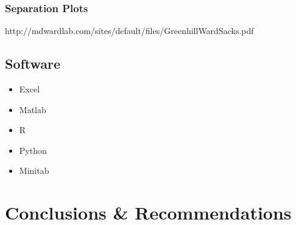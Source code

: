 \documentclass[11pt,a4paper,article]{memoir} %
\begin{document}
\subsection{Separation Plots}
http://mdwardlab.com/sites/default/files/GreenhillWardSacks.pdf

\section{Software}
\begin{itemize}
\item Excel
\item Matlab
\item R
\item Python
\item Minitab
\end{itemize}

\newpage


\chapter{Conclusions \& Recommendations}


\newpage



\newpage
\appendix
\end{document}
